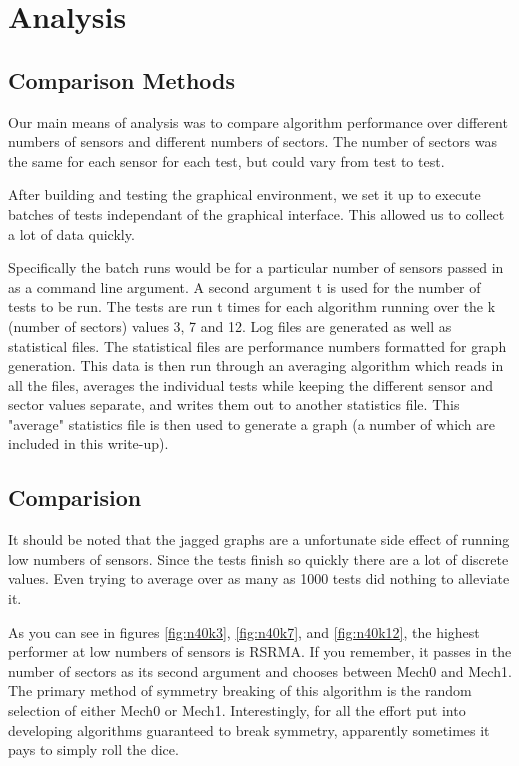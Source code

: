 \section{Analysis}

\subsection{Comparison Methods}

Our main means of analysis was to compare algorithm performance over different numbers of sensors and different numbers of sectors. The number of sectors was the same for each sensor for each test, but could vary from test to test.

After building and testing the graphical environment, we set it up to execute batches of tests independant of the graphical interface. This allowed us to collect a lot of data quickly.

Specifically the batch runs would be for a particular number of sensors passed in as a command line argument. A second argument t is used for the number of tests to be run. The tests are run t times for each algorithm running over the k (number of sectors) values  3, 7 and 12. Log files are generated as well as statistical files. The statistical files are performance numbers formatted for graph generation. 
This data is then run through an averaging algorithm which reads in all the files, averages the individual tests while keeping the different sensor and sector values separate, and writes them out to another statistics file. This "average" statistics file is then used to generate a graph (a number of which are included in this write-up).

\subsection{Comparision}

It should be noted that the jagged graphs are a unfortunate side effect of running low numbers of sensors. Since the tests finish so quickly there are a lot of discrete values. Even trying to average over as many as 1000 tests did nothing to alleviate it.

As you can see in figures \ref{fig:n40k3}, \ref{fig:n40k7}, and \ref{fig:n40k12}, the highest performer at low numbers of sensors is RSRMA. If you remember, it passes in the number of sectors as its second argument and chooses between Mech0 and Mech1. The primary method of symmetry breaking of this algorithm is the random selection of either Mech0 or Mech1. Interestingly, for all the effort put into developing algorithms guaranteed to break symmetry, apparently sometimes it pays to simply roll the dice. 

